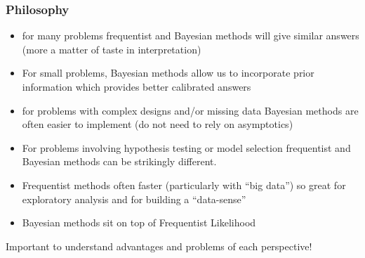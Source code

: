 \documentclass[handout]{beamer}\usepackage[]{graphicx}\usepackage[]{color}
\begin{document}
\begin{frame}
  \frametitle{Philosophy}
  \begin{itemize}
\item for many problems frequentist and Bayesian methods will give
  similar answers (more a matter of taste in interpretation) \pause
  \item For small problems, Bayesian methods allow us to incorporate
    prior information which provides better calibrated answers  \pause
  \item for problems with complex designs and/or missing data Bayesian
    methods are often easier to implement (do not need to rely
    on asymptotics)  \pause
\item For problems involving hypothesis testing or model selection
  frequentist and Bayesian methods can be strikingly different.  \pause
\item Frequentist methods often faster (particularly with ``big
  data'') so great for exploratory analysis and for building a
  ``data-sense''  \pause
\item Bayesian methods sit on top of Frequentist Likelihood  \pause
  \end{itemize}
Important to understand advantages and problems of each perspective!
\end{frame}
\end{document}
